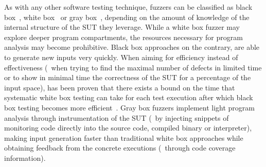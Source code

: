 As with any other software testing technique, fuzzers can be classified as black
box~\cite{hocevar2011zzuf, helin2015radamsa, householder2012probability,
woo2013scheduling}, white box~\cite{godefroid2012sage, stephens2016driller} or
gray box~\cite{bohme2017coverage, bohme2017directed, afl}, depending on the
amount of knowledge of the internal structure of the \ac{SUT} they leverage.
While a white box fuzzer may explore deeper program compartments, the resources
necessary for program analysis may become prohibitive. Black box approaches on
the contrary, are able to generate new inputs very quickly. When aiming for
efficiency instead of effectiveness (\eg~when trying to find the maximal number
of defects in limited time or to show in minimal time the correctness of the
\ac{SUT} for a percentage of the input space), has been proven that there exists
a bound on the time that systematic white box testing can take for each test
execution after which black box testing becomes more
efficient~\cite{bohme2016probabilistic}.  Gray box fuzzers implement light
program analysis through instrumentation of the \ac{SUT} (\eg~by injecting
snippets of monitoring code directly into the source code, compiled binary or
interpreter), making input generation faster than traditional white box
approaches while obtaining feedback from the concrete executions (\eg~through
code coverage information).





